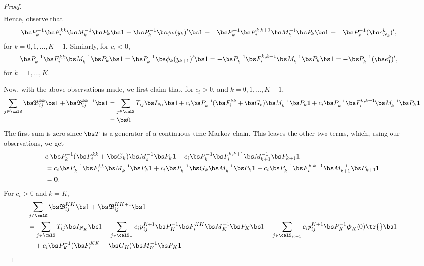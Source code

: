 \begin{proof}
\begin{align*}
	\end{align*}
	Hence, observe that 
	\begin{align*}
		&\bs P_k^{-1}\bs F_i^{kk} \bs M_k^{-1} \bs P_k \bs 1 = \bs P_k^{-1} \bs \phi_k(y_k)'\bs 1 = -\bs P_k^{-1}\bs F_i^{k,k+1} \bs M_k^{-1} \bs P_k \bs 1 = - \bs P_k^{-1}(\bs e_{N_k}^k)',
	\end{align*}
	for \(k=0,1,\dots,K-1\). 
	Similarly, for \(c_i<0\), 
	\begin{align*}
		&\bs P_k^{-1}\bs F_i^{kk} \bs M_k^{-1} \bs P_k \bs 1 = \bs P_k^{-1} \bs \phi_k(y_{k+1})'\bs 1 = -\bs P_k^{-1}\bs F_i^{k,k-1} \bs M_k^{-1} \bs P_k \bs 1 = - \bs P_k^{-1}(\bs e_{1}^k)',
	\end{align*}
	for \(k=1,\dots,K\). 

	Now, with the above observations made, we first claim that, for \(c_i>0\), and \(k=0,1,...,K-1\), 
	\begin{align*}
		\sum_{j\in\calS}\mathfrak{\bs B}^{kk}_{ij}\bs 1 + \mathfrak{\bs B}^{kk+1}_{ij}\bs 1
		&=\sum_{j\in\calS}T_{ij}\bs I_{N_k}\bs 1 + c_i \bs P_k^{-1}(\bs F_i^{kk}+\bs G_k)\bs M_k^{-1}\bs P_k\boldsymbol 1 + c_i \bs P_k^{-1}\bs F_i^{k,k+1}\bs M_k^{-1}\bs P_k\boldsymbol 1 
		\\&=\bs 0.
	\end{align*}
	The first sum is zero since \(\bs T\) is a generator of a continuous-time Markov chain. This leaves the other two terms, which, using our observations, we get 
	\begin{align*}
		& c_i \bs P_k^{-1}(\bs F_i^{kk}+\bs G_k)\bs M_k^{-1}\bs P_k\boldsymbol 1 + c_i \bs P_k^{-1}\bs F_i^{k,k+1}\bs M_{k+1}^{-1}\bs P_{k+1}\boldsymbol 1
		\\&= c_i \bs P_k^{-1}\bs F_i^{kk} \bs M_k^{-1}\bs P_k\boldsymbol 1 + c_i \bs P_k^{-1}\bs G_k\bs M_k^{-1}\bs P_k\boldsymbol 1 + c_i \bs P_k^{-1}\bs F_i^{k,k+1}\bs M_{k+1}^{-1}\bs P_{k+1}\boldsymbol 1 
		\\&= \boldsymbol 0.
	\end{align*}
	For \(c_i>0\) and \(k=K\), 
	\begin{align*}
		&\sum_{j\in\calS}\mathfrak{\bs B}^{KK}_{ij}\bs 1 + \mathfrak{\bs B}^{K{K+1}}_{ij}\bs 1
		\\&= \sum_{j\in\calS}T_{ij}\bs I_{N_K}\bs 1-\sum_{j\in\calS_-} c_ip_{ij}^{K+1} \bs P_K^{-1}\bs F_i^{KK}\bs M_K^{-1}\bs P_K \bs 1 -\sum_{j\in\calS_{{K+1} }}c_ip_{ij}^{K+1} \bs P_K^{-1}\boldsymbol \phi_K(0)\tr{}\bs 1 
		\\&\quad{} + c_i \bs P_K^{-1}(\bs F_i^{KK}+\bs G_K)\bs M_K^{-1}\bs P_K\boldsymbol 1 

\end{align*}
\end{proof}
